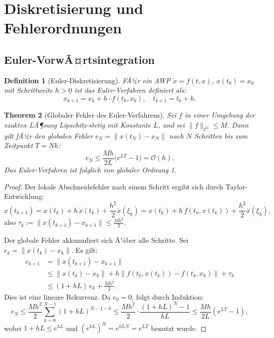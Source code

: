 ﻿\documentclass[12pt,a4paper]{article}
\newtheorem{theorem}{Theorem}[section]
\newtheorem{definition}[theorem]{Definition}
\theoremstyle{definition}
\begin{document}
\section{Diskretisierung und Fehlerordnungen}
\label{sec:diskret}


\subsection{Euler-VorwÃ¤rtsintegration}

\begin{definition}[Euler-Diskretisierung]
FÃ¼r ein AWP $\dot{x} = f(t,x)$, $x(t_0) = x_0$ mit Schrittweite $h > 0$
ist das Euler-Verfahren definiert als:
\[
  x_{k+1} = x_k + h \cdot f(t_k, x_k), \quad t_{k+1} = t_k + h.
\]
\end{definition}

\begin{theorem}[Globaler Fehler des Euler-Verfahrens]
\label{thm:euler}
Sei $f$ in einer Umgebung der exakten LÃ¶sung Lipschitz-stetig mit Konstante $L$,
und sei $\|f\|_{\mathcal{C}^2} \leq M$. Dann gilt fÃ¼r den globalen Fehler
$e_N = \|x(t_N) - x_N\|$ nach $N$ Schritten bis zum Zeitpunkt $T = Nh$:
\[
  e_N \leq \frac{Mh}{2L}\bigl(e^{LT} - 1\bigr) = \mathcal{O}(h).
\]
Das Euler-Verfahren ist folglich von globaler Ordnung 1.
\end{theorem}

\begin{proof}
Der lokale Abschneidefehler nach einem Schritt ergibt sich durch Taylor-Entwicklung:
\[
  x(t_{k+1}) = x(t_k) + h\,\dot{x}(t_k) + \frac{h^2}{2}\ddot{x}(\xi_k)
  = x(t_k) + h\,f(t_k, x(t_k)) + \frac{h^2}{2}\ddot{x}(\xi_k),
\]
also $\tau_k := \|x(t_{k+1}) - x_{k+1}\| \leq \frac{Mh^2}{2}$.

Der globale Fehler akkumuliert sich Ã¼ber alle Schritte. Sei
$e_k = \|x(t_k) - x_k\|$. Es gilt:
\begin{align*}
  e_{k+1} &= \|x(t_{k+1}) - x_{k+1}\| \\
           &\leq \|x(t_k) - x_k\| + h\|f(t_k,x(t_k)) - f(t_k,x_k)\| + \tau_k \\
           &\leq (1 + hL)\,e_k + \frac{Mh^2}{2}.
\end{align*}
Dies ist eine lineare Rekurrenz. Da $e_0 = 0$, folgt durch Induktion:
\[
  e_N \leq \frac{Mh^2}{2} \sum_{k=0}^{N-1} (1+hL)^{N-1-k}
        \leq \frac{Mh^2}{2} \cdot \frac{(1+hL)^N - 1}{hL}
        \leq \frac{Mh}{2L}(e^{LT}-1),
\]
wobei $1 + hL \leq e^{hL}$ und $(e^{hL})^N = e^{hLN} = e^{LT}$ benutzt wurde.
\end{proof}
\end{document}

